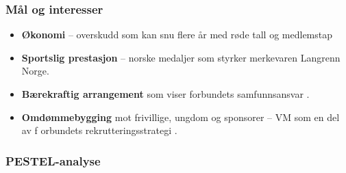 \subsubsection*{Mål og interesser}

\begin{itemize}
    \item \textbf{Økonomi} -- overskudd som kan snu flere år med røde tall og
          medlemstap\cite{Adresseavisen}

    \item \textbf{Sportslig prestasjon} -- norske medaljer som styrker merkevaren Langrenn Norge.

    \item \textbf{Bærekraftig arrangement} som viser forbundets samfunnsansvar \cite{TrondheimKommuneVM}.

    \item \textbf{Omdømmebygging} mot frivillige, ungdom og sponsorer -- VM som en del av f
          orbundets rekrutteringsstrategi \cite{OsloVM}.
\end{itemize}

\subsubsection*{PESTEL-analyse}

